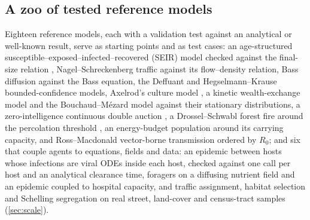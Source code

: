 \subsection{A zoo of tested reference models}
\label{sec:zoo}

Eighteen reference models, each with a validation test against an analytical or well-known
result, serve as starting points and as test cases: an age-structured susceptible--exposed--infected--recovered (SEIR) model checked
against the final-size relation \citep{kermack1927contribution}, Nagel--Schreckenberg traffic
\citep{nagel1992cellular} against its flow--density relation, Bass diffusion
\citep{bass1969new} against the Bass equation, the Deffuant \citep{deffuant2000mixing} and
Hegselmann--Krause \citep{hegselmann2002opinion} bounded-confidence models, Axelrod's culture
model \citep{axelrod1997dissemination}, a kinetic wealth-exchange model
\citep{dragulescu2000statistical} and the Bouchaud--M{\'e}zard model
\citep{bouchaud2000wealth} against their stationary distributions, a zero-intelligence
continuous double auction \citep{farmer2005predictive}, a Drossel--Schwabl forest fire
\citep{drossel1992self} around the percolation threshold \citep{newman2000efficient}, an
energy-budget population \citep{sibly2013representing} around its carrying capacity, and
Ross--Macdonald vector-borne transmission \citep{smith2012ross} ordered by $R_0$; and six
that couple agents to equations, fields and data: an epidemic between hosts whose infections
are viral ODEs inside each host, checked against one  call per host and an
analytical clearance time, foragers on a diffusing nutrient field and an epidemic coupled to hospital
capacity, and traffic assignment, habitat selection and Schelling segregation on real
street, land-cover and census-tract samples (\cref{sec:scale}).
